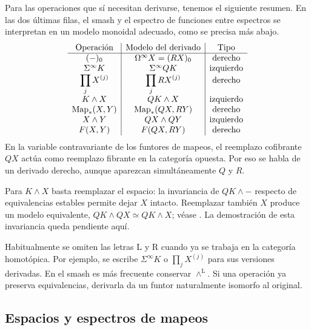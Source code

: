 Para las operaciones que sí necesitan derivarse, tenemos el siguiente resumen. En las dos últimas filas, el smash y el espectro de funciones entre espectros se interpretan en un modelo monoidal adecuado, como se precisa más abajo.
\[
\begin{array}{c|c|c}
\text{Operación} & \text{Modelo del derivado} & \text{Tipo}\\ \hline
(-)_0 & \Omega^\infty X=(RX)_0 & \text{derecho}\\
\Sigma^\infty K & \Sigma^\infty QK & \text{izquierdo}\\
\displaystyle\prod_jX^{(j)} & \displaystyle\prod_jRX^{(j)} & \text{derecho}\\
K\wedge X & QK\wedge X & \text{izquierdo}\\
\operatorname{Map}_*(X,Y) & \operatorname{Map}_*(QX,RY) & \text{derecho}\\
X\wedge Y & QX\wedge QY & \text{izquierdo}\\
F(X,Y) & F(QX,RY) & \text{derecho}
\end{array}
\]
En la variable contravariante de los funtores de mapeos, el reemplazo cofibrante $QX$ actúa como reemplazo fibrante en la categoría opuesta. Por eso se habla de un derivado derecho, aunque aparezcan simultáneamente $Q$ y $R$.

Para $K\wedge X$ basta reemplazar el espacio: la invariancia de $QK\wedge-$ respecto de equivalencias estables permite dejar $X$ intacto. Reemplazar también $X$ produce un modelo equivalente, $QK\wedge QX\simeq QK\wedge X$; véase \cite[Ejemplo~3.4.3.4]{malkiewich}. La demostración de esta invariancia queda pendiente aquí.

\begin{nota}
Habitualmente se omiten las letras $\mathrm L$ y $\mathrm R$ cuando ya se trabaja en la categoría homotópica. Por ejemplo, se escribe $\Sigma^\infty K$ o $\prod_jX^{(j)}$ para sus versiones derivadas. En el smash es más frecuente conservar $\wedge^{\mathrm L}$. Si una operación ya preserva equivalencias, derivarla da un funtor naturalmente isomorfo al original.
\end{nota}

\subsection{Espacios y espectros de mapeos}

